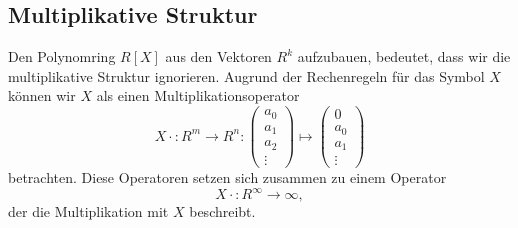 \subsection{Multiplikative Struktur
\label{buch:subsection:polynome:multiplikativestruktur}}
Den Polynomring $R[X]$ aus den Vektoren $R^{k}$ aufzubauen, bedeutet,
dass wir die multiplikative Struktur ignorieren.
Augrund der Rechenregeln für das Symbol $X$ können wir $X$ als einen
Multiplikationsoperator 
\[
{X\cdot} 
\colon R^{m} \to R^{n}
:
\begin{pmatrix}a_0\\a_1\\a_2\\\vdots\end{pmatrix}
\mapsto
\begin{pmatrix}0\\a_0\\a_1\\\vdots\end{pmatrix}
\]
betrachten.
Diese Operatoren setzen sich zusammen zu einem Operator
\[
{X\cdot} \colon R^\infty \to \infty,
\]
der die Multiplikation mit $X$ beschreibt.

